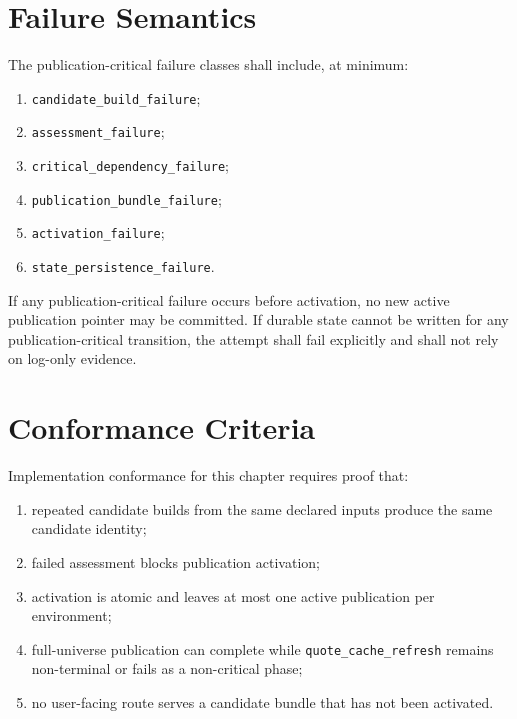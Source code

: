 \documentclass[11pt]{report}
\begin{document}
\section{Failure Semantics}
The publication-critical failure classes shall include, at minimum:
\begin{enumerate}[leftmargin=1.2cm]
    \item \texttt{candidate\_build\_failure};
    \item \texttt{assessment\_failure};
    \item \texttt{critical\_dependency\_failure};
    \item \texttt{publication\_bundle\_failure};
    \item \texttt{activation\_failure};
    \item \texttt{state\_persistence\_failure}.
\end{enumerate}

If any publication-critical failure occurs before activation, no new active publication pointer may be committed. If durable state cannot be written for any publication-critical transition, the attempt shall fail explicitly and shall not rely on log-only evidence.

\section{Conformance Criteria}
Implementation conformance for this chapter requires proof that:
\begin{enumerate}[leftmargin=1.2cm]
    \item repeated candidate builds from the same declared inputs produce the same candidate identity;
    \item failed assessment blocks publication activation;
    \item activation is atomic and leaves at most one active publication per environment;
    \item full-universe publication can complete while \texttt{quote\_cache\_refresh} remains non-terminal or fails as a non-critical phase;
    \item no user-facing route serves a candidate bundle that has not been activated.
\end{enumerate}
\end{document}
